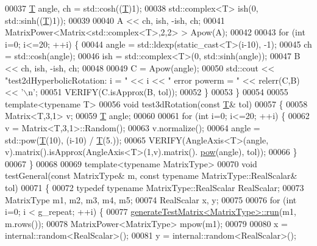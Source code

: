 \begin{DoxyCode}
00037   \hyperlink{group___sparse_core___module_class_eigen_1_1_triplet}{T} angle, ch = std::cosh((\hyperlink{group___sparse_core___module_class_eigen_1_1_triplet}{T})1);
00038   std::complex<T> ish(0, std::sinh((\hyperlink{group___sparse_core___module_class_eigen_1_1_triplet}{T})1));
00039 
00040   A << ch, ish, -ish, ch;
00041   MatrixPower<Matrix<std::complex<T>,2,2> > Apow(A);
00042 
00043   \textcolor{keywordflow}{for} (\textcolor{keywordtype}{int} i=0; i<=20; ++i) \{
00044     angle = std::ldexp(static\_cast<T>(i-10), -1);
00045     ch = std::cosh(angle);
00046     ish = std::complex<T>(0, std::sinh(angle));
00047     B << ch, ish, -ish, ch;
00048 
00049     C = Apow(angle);
00050     std::cout << \textcolor{stringliteral}{"test2dHyperbolicRotation: i = "} << i << \textcolor{stringliteral}{"   error powerm = "} << relerr(C,B) << \textcolor{charliteral}{'\(\backslash\)n'};
00051     VERIFY(C.isApprox(B, tol));
00052   \}
00053 \}
00054 
00055 \textcolor{keyword}{template}<\textcolor{keyword}{typename} T>
00056 \textcolor{keywordtype}{void} test3dRotation(\textcolor{keyword}{const} \hyperlink{group___sparse_core___module_class_eigen_1_1_triplet}{T}& tol)
00057 \{
00058   Matrix<T,3,1> v;
00059   \hyperlink{group___sparse_core___module_class_eigen_1_1_triplet}{T} angle;
00060 
00061   \textcolor{keywordflow}{for} (\textcolor{keywordtype}{int} i=0; i<=20; ++i) \{
00062     v = Matrix<T,3,1>::Random();
00063     v.normalize();
00064     angle = std::pow(\hyperlink{group___sparse_core___module_class_eigen_1_1_triplet}{T}(10), (i-10) / \hyperlink{group___sparse_core___module_class_eigen_1_1_triplet}{T}(5.));
00065     VERIFY(AngleAxis<T>(angle, v).matrix().isApprox(AngleAxis<T>(1,v).matrix().
      \hyperlink{group___core___module_ab6dc101d82e8228a19a8840e3a29c1c9}{pow}(angle), tol));
00066   \}
00067 \}
00068 
00069 \textcolor{keyword}{template}<\textcolor{keyword}{typename} MatrixType>
00070 \textcolor{keywordtype}{void} testGeneral(\textcolor{keyword}{const} MatrixType& m, \textcolor{keyword}{const} \textcolor{keyword}{typename} MatrixType::RealScalar& tol)
00071 \{
00072   \textcolor{keyword}{typedef} \textcolor{keyword}{typename} MatrixType::RealScalar RealScalar;
00073   MatrixType m1, m2, m3, m4, m5;
00074   RealScalar x, y;
00075 
00076   \textcolor{keywordflow}{for} (\textcolor{keywordtype}{int} i=0; i < g\_repeat; ++i) \{
00077     \hyperlink{structgenerate_test_matrix}{generateTestMatrix<MatrixType>::run}(m1, m.rows());
00078     MatrixPower<MatrixType> mpow(m1);
00079 
00080     x = internal::random<RealScalar>();
00081     y = internal::random<RealScalar>();

\end{DoxyCode}
